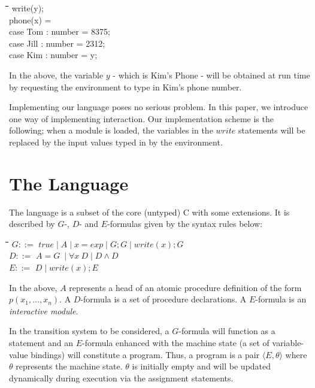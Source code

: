 \documentclass[12pt]{article}
\newcommand{\sep}{\;\vert\;}
\newcommand{\all}{\forall}
\newenvironment{exmple}{
 \begingroup \begin{tabbing} \hspace{2em}\= \hspace{3em}\= \hspace{3em}\=
\hspace{3em}\= \hspace{3em}\= \hspace{3em}\= \kill}{
 \end{tabbing}\endgroup}
\newenvironment{example}{
\begingroup  \begin{tabbing} \hspace{2em}\= \hspace{3em}\= \hspace{3em}\=
\hspace{3em}\= \hspace{3em}\= \hspace{3em}\= \hspace{3em}\= \hspace{3em}\= 
\hspace{3em}\= \hspace{3em}\= \hspace{3em}\= \hspace{3em}\= \kill}{
 \end{tabbing} \endgroup }
\newcommand{\lb}{\langle}
\newcommand{\rb}{\rangle}
\begin{document}
\begin{example}
	write(y); \\
	phone(x) = 		\\
	\>	case Tom : number = 8375;\\
	\>	case Jill : number = 2312;\\
	\>	case Kim : number = y;
\end{example}

In the above, the variable  $y$ - which is Kim's Phone - will be obtained at run time by
requesting the environment to type in Kim's phone number.


Implementing our language poses no serious problem.
 In this paper, we introduce one 
 way of implementing interaction.
Our implementation scheme is the following; when a module is loaded, the variables in the $write$
statements   will be replaced by the input values typed in by the environment.


\section{The Language}\label{sec:logic}

The language is a subset of the core (untyped) C
 with some extensions. It is described
by $G$-, $D$- and $E$-formulas given by the syntax rules below:
\begin{exmple}
\>$G ::=$ \>   $true \sep A \sep x = exp \sep  G;G  \sep write(x);G$ \\  
\>$D ::=$ \>  $ A = G\ \sep \all x\ D \sep D \land D $\\
\>$E ::=$ \>  $ D \sep write(x); E$\\
\end{exmple}
\noindent
 In the above, 
$A$  represents a head of an atomic procedure definition of the form $p(x_1,\ldots,x_n)$. 
A $D$-formula is a set
of procedure declarations. A $E$-formula is an {\it interactive module}.

In the transition system to be considered, a $G$-formula will function as a statement 
and an   $E$-formula  enhanced with the
machine state (a set of variable-value bindings) will constitute  a program.
Thus, a program is a pair   $\lb  E,  \theta\rb$
where  $\theta$ represents the machine state.
$\theta$ is initially  empty  and will be updated dynamically during execution
via the assignment statements. 
\end{document}
